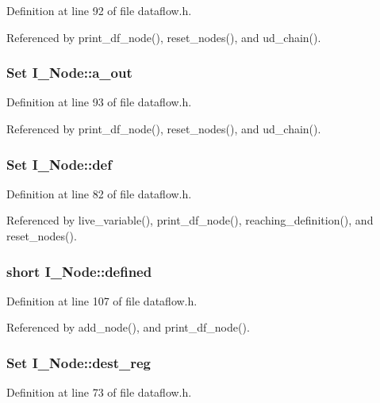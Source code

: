Definition at line 92 of file dataflow.h.

Referenced by print\_\-df\_\-node(), reset\_\-nodes(), and ud\_\-chain().
\subsubsection{\setlength{\rightskip}{0pt plus 5cm}\bf{Set} \bf{I\_\-Node::a\_\-out}}\label{structI__Node_cbf92288d489d56aabae17d73d37a00b}




Definition at line 93 of file dataflow.h.

Referenced by print\_\-df\_\-node(), reset\_\-nodes(), and ud\_\-chain().
\subsubsection{\setlength{\rightskip}{0pt plus 5cm}\bf{Set} \bf{I\_\-Node::def}}\label{structI__Node_5f7dc9718772003f24949a7bcfdc1887}




Definition at line 82 of file dataflow.h.

Referenced by live\_\-variable(), print\_\-df\_\-node(), reaching\_\-definition(), and reset\_\-nodes().
\subsubsection{\setlength{\rightskip}{0pt plus 5cm}short \bf{I\_\-Node::defined}}\label{structI__Node_f38714d06c52046ebe6b1b4c7244fee6}




Definition at line 107 of file dataflow.h.

Referenced by add\_\-node(), and print\_\-df\_\-node().
\subsubsection{\setlength{\rightskip}{0pt plus 5cm}\bf{Set} \bf{I\_\-Node::dest\_\-reg}}\label{structI__Node_2dfeda2ddc75a40ad9417df2292ffe31}




Definition at line 73 of file dataflow.h.

